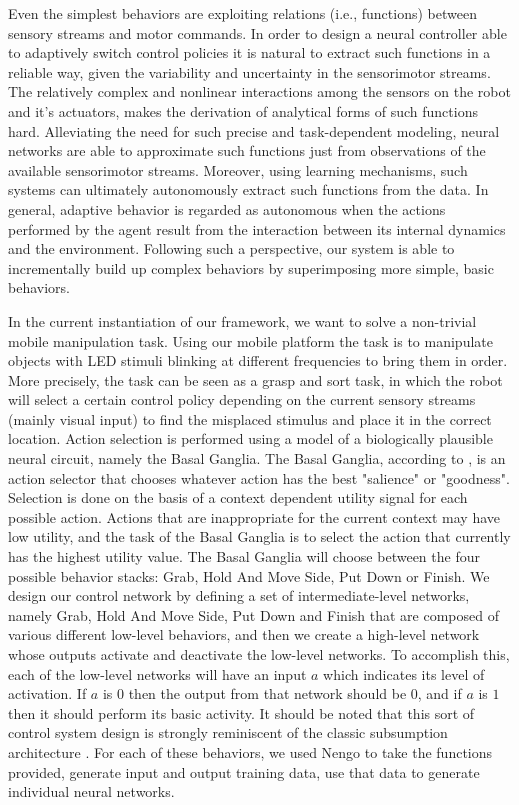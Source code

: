 Even the simplest behaviors are exploiting relations (i.e., functions) between sensory streams and motor commands. 
In order to design a neural controller able to adaptively switch control policies it is natural to extract such functions in a reliable way, given the variability and uncertainty in the sensorimotor streams. 
The relatively complex and nonlinear interactions among the sensors on the robot and it’s actuators, makes the derivation of analytical forms of such functions hard. 
Alleviating the need for such precise and task-dependent modeling, neural networks are able to approximate such functions just from observations of the available sensorimotor streams. 
Moreover, using learning mechanisms, such systems can ultimately autonomously extract such functions from the data. 
In general, adaptive behavior is regarded as autonomous when the actions performed by the agent result from the interaction between its internal dynamics and the environment. 
Following such a perspective, our system is able to incrementally build up complex behaviors by superimposing more simple, basic behaviors.

In the current instantiation of our framework, we want to solve a non-trivial mobile manipulation task. 
Using our mobile platform the task is to manipulate objects with LED stimuli blinking at different frequencies to bring them in order. 
More precisely, the task can be seen as a grasp and sort task, in which the robot will select a certain control policy depending on the current sensory streams (mainly visual input) to find the misplaced stimulus and place it in the correct location. 
Action selection is performed using a model of a biologically plausible neural circuit, namely the Basal Ganglia. 
The Basal Ganglia, according to \cite{Stewart2010}, is an action selector that chooses whatever action has the best "salience" or "goodness". 
Selection is done on the basis of a context dependent utility signal for each possible action. 
Actions that are inappropriate for the current context may have low utility, and the task of the Basal Ganglia is to select the action that currently has the highest utility value.
The Basal Ganglia will choose between the four possible behavior stacks: Grab, Hold And Move Side, Put Down or Finish.
We design our control network by defining a set of intermediate-level networks, namely Grab, Hold And Move Side, Put Down and Finish that are composed of various different low-level behaviors, and then we create a high-level network whose outputs activate and deactivate the low-level networks. 
To accomplish this, each of the low-level networks will have an input $a$ which indicates its level of activation. 
If $a$ is $0$ then the output from that network should be $0$, and if $a$ is $1$ then it should perform its basic activity. 
It should be noted that this sort of control system design is strongly reminiscent of the classic subsumption architecture \cite{Brooks1986}.
For each of these behaviors, we used \ac{Nengo} to take the functions provided, generate input and output training data, use that data to generate individual neural networks.

